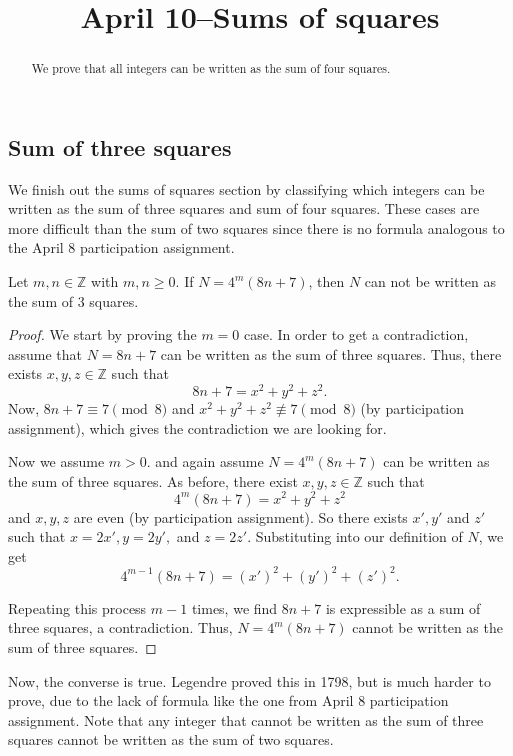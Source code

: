 \documentclass{ximera}
\title{April 10--Sums of squares}
\begin{document}
  
\begin{abstract}  We prove that all integers can be written as the sum of four squares.
\end{abstract}
\maketitle  

\subsection{Sum of three squares}
We finish out the sums of squares section by classifying which integers can be written as the sum of three squares and sum of four squares. These cases are more difficult than the sum of two squares since there is no formula analogous to the April 8 participation assignment.

\begin{theorem}
Let $m,n\in\mathbb{Z}$ with $m,n\geq0$. If $N=4^m(8n+7)$, then $N$ can not be written as the sum of $3$ squares.
\end{theorem}
\begin{proof}
 We start by proving the $m=0$ case. In order to get a contradiction, assume that $N=8n+7$ can be written as the sum of three squares. Thus, there exists $x,y,z\in\mathbb{Z}$ such that \[8n+7=x^2+y^2+z^2.\]
 Now, $8n+7\equiv 7\pmod8$ and $x^2+y^2+z^2\not\equiv7\pmod 8$ (by participation assignment), which gives the contradiction we are looking for.

Now we assume $m>0$. and again assume $N=4^m(8n+7)$ can be written as the sum of three squares. As before, there exist $x,y,z\in\mathbb{Z}$ such that \[4^m(8n+7)=x^2+y^2+z^2\] and $x,y,z$ are even (by participation assignment). So there exists $x',y'$ and $z'$ such that $x=2x', y=2y',$ and $z=2z'$. Substituting into our definition of $N$, we get \[4^{m-1}(8n+7)=(x')^2+(y')^2+(z')^2.\]

Repeating  this process $m-1$ times, we find $8n+7$ is expressible as a sum of three squares, a contradiction. Thus, $N=4^m(8n+7)$ cannot be written as the sum of three squares.
\end{proof}

Now, the converse is true. Legendre proved this in 1798, but is much harder to prove, due to the lack of formula like the one from April 8 participation assignment. Note that any integer that cannot be written as the sum of three squares cannot be written as the sum of two squares.
\end{document}
